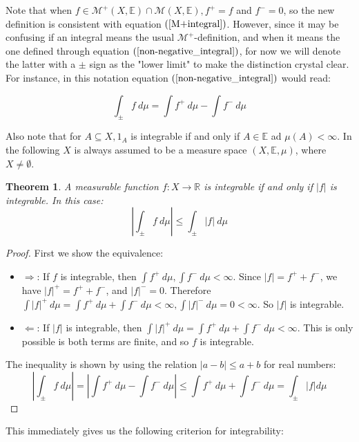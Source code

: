 \documentclass[12pt, a4paper]{article}
\newtheorem{theorem}{Theorem}[section]
\numberwithin{equation}{section}
\begin{document}
Note that when $f\in\mathcal{M}^+(X,\mathbb{E})\cap\mathcal{M}(X,\mathbb{E}), f^+=f$ and $f^-=0$, so the new definition is consistent with equation $(\ref{M+integral})$. However, since it may be confusing if an integral means the usual $\mathcal{M}^+$-definition, and when it means the one defined through equation $(\ref{non-negative_integral})$, for now we will denote the latter with a $\pm$ sign as the "lower limit" to make the distinction crystal clear. For instance, in this notation equation $(\ref{non-negative_integral})$ would read:

\begin{equation}
\int_\pm f\ d\mu=\int f^+\ d\mu - \int f^-\ d\mu
\end{equation}

Also note that for $A\subseteq X, 1_A$ is integrable if and only if $A\in\mathbb{E}$ ad $\mu(A)<\infty$. In the following $X$ is always assumed to be a measure space $(X,\mathbb{E},\mu)$, where $X\neq\emptyset$.

\begin{theorem}
\label{measurable_absolute}
A measurable function $f: X\rightarrow\mathbb{R}$ is integrable if and only if $|f|$ is integrable. In this case:
\begin{equation}
\left|\int_\pm f\ d\mu\right|\le\int_\pm|f|\ d\mu
\end{equation}
\end{theorem}
\begin{proof}
First we show the equivalence:
\begin{itemize}
\item $\Rightarrow$: If $f$ is integrable, then $\int f^+\ d\mu, \int f^-\ d\mu<\infty$. Since $|f|=f^+ +f^-$, we have $|f|^+=f^+ +f^-$, and $|f|^-=0$. Therefore $\int |f|^+\ d\mu=\int f^+\ d\mu+\int f^-\ d\mu<\infty, \int |f|^-\ d\mu=0<\infty$. So $|f|$ is integrable. 
\item $\Leftarrow$: If $|f|$ is integrable, then $\int |f|^+\ d\mu=\int f^+\ d\mu+\int f^-\ d\mu<\infty$. This is only possible is both terms are finite, and so $f$ is integrable.
\end{itemize}
The inequality is shown by using the relation $|a-b|\le a+b$ for real numbers:
\begin{equation}
\left|\int_\pm f\ d\mu\right|=\left|\int f^+\ d\mu-\int f^-\ d\mu\right|\le\int f^+\ d\mu+\int f^-\ d\mu=\int_\pm |f|d\mu
\end{equation}
\end{proof}

This immediately gives us the following criterion for integrability:
\end{document}
